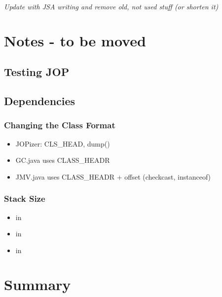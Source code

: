 \emph{Update with JSA writing and remove old, not used stuff (or
shorten it)}
    


\chapter{Notes - to be moved}

\section{Testing JOP}



\section{Dependencies}

\subsection{Changing the Class Format}

\begin{itemize}
    \item JOPizer: CLS\_HEAD, dump()
    \item GC.java uses CLASS\_HEADR
    \item JMV.java uses CLASS\_HEADR + offset (checkcast, instanceof)
\end{itemize}

\subsection{Stack Size}

\begin{itemize}
    \item {} in 
    \item {} in 
    \item {} in 
\end{itemize}

\chapter{Summary}
\label{chap:conclusions}

    







